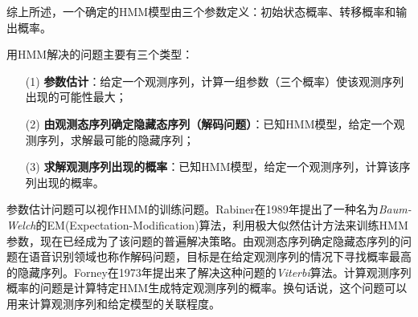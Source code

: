 综上所述，一个确定的HMM模型由三个参数定义：初始状态概率、转移概率和输出概率。

用HMM解决的问题主要有三个类型：

\begin{enumerate}		
	\item[(1)] \textbf{参数估计}：给定一个观测序列，计算一组参数（三个概率）使该观测序列出现的可能性最大；
	\item[(2)] \textbf{由观测态序列确定隐藏态序列（解码问题）}：已知HMM模型，给定一个观测序列，求解最可能的隐藏序列；
	\item[(3)] \textbf{求解观测序列出现的概率}：已知HMM模型，给定一个观测序列，计算该序列出现的概率。
\end{enumerate}

参数估计问题可以视作HMM的训练问题。Rabiner在1989年提出了一种名为\emph{Baum-Welch}\cite{Rabiner:1989}的EM(Expectation-Modification)算法，利用极大似然估计方法来训练HMM参数，现在已经成为了该问题的普遍解决策略。由观测态序列确定隐藏态序列的问题在语音识别领域也称作解码问题，目标是在给定观测序列的情况下寻找概率最高的隐藏序列。Forney在1973年提出来了解决这种问题的\emph{Viterbi}\cite{Forney:1973}算法。计算观测序列概率的问题是计算特定HMM生成特定观测序列的概率。换句话说，这个问题可以用来计算观测序列和给定模型的关联程度。


